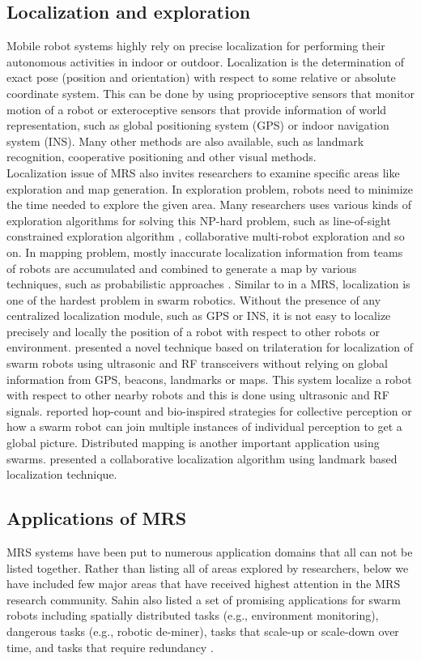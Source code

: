 \subsection{Localization and exploration}
\label{bg:mrs:loc}
Mobile robot systems highly rely on precise localization for performing their autonomous activities in indoor or outdoor. Localization is the determination of exact pose (position and orientation) with respect to some relative or absolute coordinate system. This can be done by using proprioceptive sensors that monitor motion of a robot or exteroceptive sensors that provide information of world representation, such as global positioning system (GPS) or indoor navigation system (INS). Many other methods are also available, such as landmark recognition, cooperative positioning and other visual methods.\\
Localization issue of MRS also invites researchers to examine specific areas like exploration and map generation. In exploration problem, robots need to minimize the time needed to explore the given area. Many researchers uses various kinds of exploration algorithms for solving this NP-hard problem, such as line-of-sight constrained exploration algorithm \cite{Arkin+2002}, collaborative multi-robot exploration \cite{Burgard+2000} and so on. In mapping problem, mostly inaccurate localization information from teams of robots are accumulated and combined to generate a map by various techniques, such as probabilistic approaches \cite{Thurn+2000}.
Similar to in a MRS, localization is one of the hardest problem in swarm robotics. Without the presence of any centralized localization module, such as GPS or INS, it is not easy to localize precisely and locally the position of a robot with respect to other robots or environment. \cite{Spears+2006} presented a novel technique based on trilateration for localization of swarm robots using ultrasonic and RF transceivers without relying on global information from GPS, beacons, landmarks or maps. This system localize a robot with respect to other nearby robots and this is done using ultrasonic and RF signals. \cite{Schmickl+2006} reported hop-count and bio-inspired strategies for collective perception or how a swarm robot can join multiple instances of individual perception to get a global picture. Distributed mapping is another important application using swarms. \cite{Rothermich+05} presented a collaborative localization algorithm using landmark based localization technique.

\subsection{Applications of MRS}
\label{bg:app}
MRS systems have been put to numerous application domains that all can not be listed together. Rather than listing all of areas explored by researchers, below we have included few major areas that have received highest attention in the MRS research community. Sahin also listed a set of promising applications for swarm robots including spatially distributed tasks (e.g., environment monitoring), dangerous tasks (e.g., robotic de-miner), tasks that scale-up or scale-down over time, and tasks that require redundancy \cite{Sahin+2005}.
